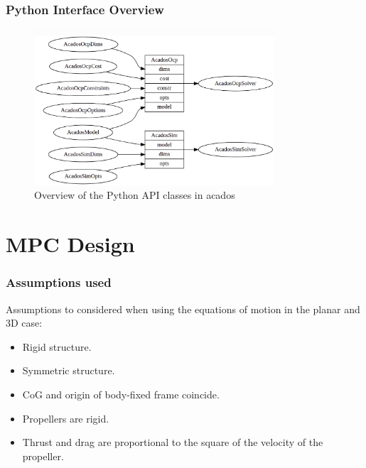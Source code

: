 \documentclass{thesisbeamer}
\newcommand\Fontvi{\fontsize{9}{10}\selectfont}
\begin{document}
\begin{frame}
	\frametitle{Python Interface Overview}
	\Fontvi
		
	\begin{figure}[h]
 		\centering
 		\includegraphics[width=0.8\textwidth]{Images/acados/python_interface.png}
 		\caption{Overview of the Python API classes in acados\protect\footnotemark}
 		\label{fig:python_interface}
 	\end{figure}
\end{frame}



\section{MPC Design}

\begin{frame}
	\frametitle{Assumptions used}
	\Fontvi
	
	Assumptions to considered when using the equations of motion in the planar and 3D case:
	
	\begin{itemize} %
		\item Rigid structure.
		\item Symmetric structure.
		\item CoG and origin of body-fixed frame coincide.
		\item Propellers are rigid.
		\item Thrust and drag are proportional to the square of the velocity of the propeller.
	\end{itemize}

\end{frame}
\end{document}

